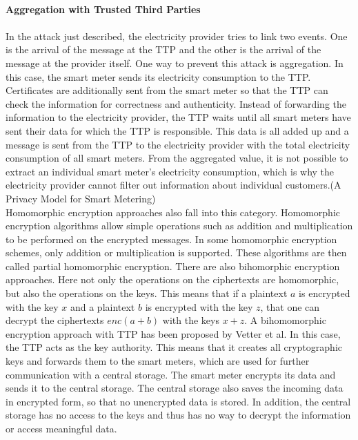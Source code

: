 \\
\textbf{Aggregation with Trusted Third Parties}
\\
\\
In the attack just described, the electricity provider tries to link two events. One is the arrival of the message at the \gls{TTP} and the other is the arrival of the message at the provider itself. One way to prevent this attack is aggregation. In this case, the smart meter sends its electricity consumption to the \gls{TTP}. Certificates are additionally sent from the smart meter so that the \gls{TTP} can check the information for correctness and authenticity. Instead of forwarding the information to the electricity provider, the \gls{TTP} waits until all smart meters have sent their data for which the \gls{TTP} is responsible. This data is all added up and a message is sent from the \gls{TTP} to the electricity provider with the total electricity consumption of all smart meters. From the aggregated value, it is not possible to extract an individual smart meter's electricity consumption, which is why the electricity provider cannot filter out information about individual customers.(A Privacy Model for Smart Metering)\\
Homomorphic encryption approaches also fall into this category. Homomorphic encryption algorithms allow simple operations such as addition and multiplication to be performed on the encrypted messages.  In some homomorphic encryption schemes, only addition or multiplication is supported. These algorithms are then called partial homomorphic encryption.
There are also bihomorphic encryption approaches. Here not only the operations on the ciphertexts are homomorphic, but also the operations on the keys. This means that if a plaintext $a$ is encrypted with the key $x$ and a plaintext $b$ is encrypted with the key $z$, that one can decrypt the ciphertexts $enc(a+b)$ with the keys $x+z$. A bihomomorphic encryption approach with \gls{TTP} has been proposed by Vetter et al\cite{vetter2012homomorphic}. In this case, the \gls{TTP} acts as the key authority. This means that it creates all cryptographic keys and forwards them to the smart meters, which are used for further communication with a central storage. The smart meter encrypts its data and sends it to the central storage. The central storage also saves the incoming data in encrypted form, so that no unencrypted data is stored. In addition, the central storage has no access to the keys and thus has no way to decrypt the information or access meaningful data.\\
